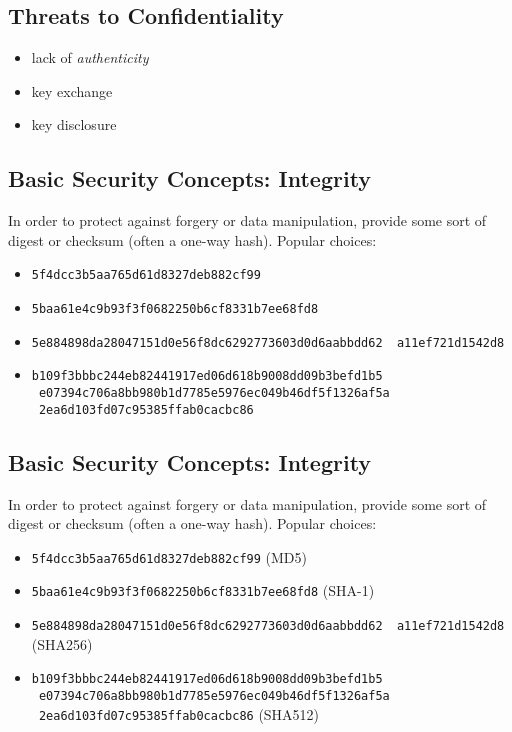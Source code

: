 \documentclass[xga]{xdvislides}
\begin{document}
\subsection{Threats to Confidentiality}
\begin{itemize}
	\item lack of {\em authenticity}
	\item key exchange
	\item key disclosure
\end{itemize}

\subsection{Basic Security Concepts: Integrity}
In order to protect against forgery or data manipulation, provide some sort of
digest or checksum (often a one-way hash).  Popular choices:

\begin{itemize}
	\item {\tt 5f4dcc3b5aa765d61d8327deb882cf99}
	\item {\tt 5baa61e4c9b93f3f0682250b6cf8331b7ee68fd8}
	\item {\tt 5e884898da28047151d0e56f8dc6292773603d0d6aabbdd62 \
                   a11ef721d1542d8}
	\item {\tt b109f3bbbc244eb82441917ed06d618b9008dd09b3befd1b5 \
                   e07394c706a8bb980b1d7785e5976ec049b46df5f1326af5a \
                   2ea6d103fd07c95385ffab0cacbc86}
\end{itemize}

\subsection{Basic Security Concepts: Integrity}
In order to protect against forgery or data manipulation, provide some sort of
digest or checksum (often a one-way hash).  Popular choices:

\begin{itemize}
	\item {\tt 5f4dcc3b5aa765d61d8327deb882cf99} (MD5)
	\item {\tt 5baa61e4c9b93f3f0682250b6cf8331b7ee68fd8} (SHA-1)
	\item {\tt 5e884898da28047151d0e56f8dc6292773603d0d6aabbdd62 \
                   a11ef721d1542d8} (SHA256)
	\item {\tt b109f3bbbc244eb82441917ed06d618b9008dd09b3befd1b5 \
                   e07394c706a8bb980b1d7785e5976ec049b46df5f1326af5a \
                   2ea6d103fd07c95385ffab0cacbc86} (SHA512)
\end{itemize}
\end{document}
